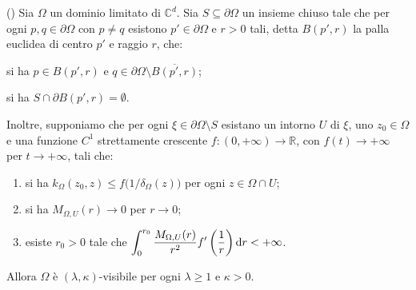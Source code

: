 \begin{thm} \label{extvis}
    (\cite[Theorem 1.9]{CMS}) Sia $\Omega$ un dominio limitato di $\mathbb{C}^d$. Sia $S\subseteq\partial\Omega$ un insieme chiuso tale che per ogni $p,q\in\partial\Omega$ con $p\not=q$ esistono $p'\in\partial\Omega$ e $r>0$ tali, detta $B(p',r)$ la palla euclidea di centro $p'$ e raggio $r$, che:
    \begin{nlist}
        \item si ha $p\in B(p',r)$ e $q\in\partial\Omega\setminus\overline{B(p',r)}$;
        \item si ha $S\cap\partial B(p',r)=\emptyset$.
    \end{nlist}
    
    Inoltre, supponiamo che per ogni $\xi\in\partial\Omega\setminus S$ esistano un intorno $U$ di $\xi$, uno $z_0\in\Omega$ e una funzione $C^1$ strettamente crescente $f:(0,+\infty)\longrightarrow\mathbb{R}$, con $f(t)\longrightarrow+\infty$ per $t\longrightarrow+\infty$, tali che:
    \begin{enumerate}[label={(\arabic*)}]
        \item si ha $k_\Omega(z_0,z) \le f\big(1/\delta_\Omega(z)\big)$ per ogni $z\in\Omega\cap U$;
        \item si ha $M_{\Omega,U}(r)\longrightarrow 0$ per $r\longrightarrow 0$;
        \item esiste $r_0>0$ tale che $\displaystyle\int_0^{r_0}\frac{M_{\Omega,U}(r)}{r^2}f'\left(\frac{1}{r}\right)\mathop{}\!\mathrm{d} r<+\infty$.
    \end{enumerate}

    Allora $\Omega$ è $(\lambda,\kappa)$-visibile per ogni $\lambda \ge 1$ e $\kappa>0$.
\end{thm}

